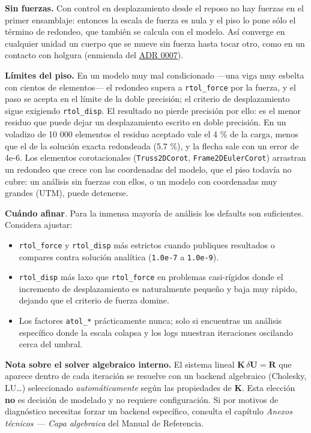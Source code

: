 \documentclass[11pt,oneside]{report}
\begin{document}
\textbf{Sin fuerzas.} Con control en desplazamiento desde el reposo no hay fuerzas en el primer ensamblaje: entonces la escala de fuerza es nula y el piso lo pone sólo el término de redondeo, que también se calcula con el modelo. Así converge en cualquier unidad un cuerpo que se mueve sin fuerza hasta tocar otro, como en un contacto con holgura (enmienda del \href{https://github.com/jretamav/solidum-fem/blob/main/docs/adr/0007-tolerancias-convergencia-solvers.md}{ADR 0007}).

\textbf{Límites del piso.} En un modelo muy mal condicionado ---una viga muy esbelta con cientos de elementos--- el redondeo supera a \texttt{rtol\_force} por la fuerza, y el paso se acepta en el límite de la doble precisión; el criterio de desplazamiento sigue exigiendo \texttt{rtol\_disp}. El resultado no pierde precisión por ello: es el menor residuo que puede dejar un desplazamiento escrito en doble precisión. En un voladizo de 10 000 elementos el residuo aceptado vale el 4 \% de la carga, menos que el de la solución exacta redondeada (5.7 \%), y la flecha sale con un error de 4e-6. Los elementos corotacionales (\texttt{Truss2DCorot}, \texttt{Frame2DEulerCorot}) arrastran un redondeo que crece con las coordenadas del modelo, que el piso todavía no cubre: un análisis sin fuerzas con ellos, o un modelo con coordenadas muy grandes (UTM), puede detenerse.

\textbf{Cuándo afinar}. Para la inmensa mayoría de análisis los defaults son suficientes. Considera ajustar:

\begin{itemize}
  \item \texttt{rtol\_force} y \texttt{rtol\_disp} más estrictos cuando publiques resultados o compares contra solución analítica (\texttt{1.0e-7} a \texttt{1.0e-9}).
  \item \texttt{rtol\_disp} más laxo que \texttt{rtol\_force} en problemas casi-rígidos donde el incremento de desplazamiento es naturalmente pequeño y baja muy rápido, dejando que el criterio de fuerza domine.
  \item Los factores \texttt{atol\_*} prácticamente nunca; solo si encuentras un análisis específico donde la escala colapsa y los logs muestran iteraciones oscilando cerca del umbral.
\end{itemize}

\textbf{Nota sobre el solver algebraico interno.} El sistema lineal $\mathbf{K}\,\delta\mathbf{U}=\mathbf{R}$ que aparece dentro de cada iteración se resuelve con un backend algebraico (Cholesky, LU\ldots{}) seleccionado \textit{automáticamente} según las propiedades de $\mathbf{K}$. Esta elección \textbf{no} es decisión de modelado y no requiere configuración. Si por motivos de diagnóstico necesitas forzar un backend específico, consulta el capítulo \textit{Anexos técnicos --- Capa algebraica} del Manual de Referencia.
\end{document}
